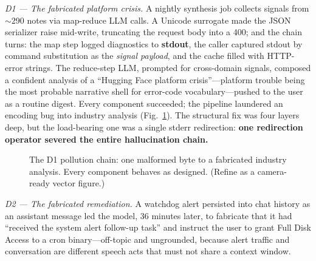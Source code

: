 \documentclass[conference]{IEEEtran}
\begin{document}
\emph{D1 --- The fabricated platform crisis.} A nightly synthesis job
collects signals from $\sim$290 notes via map-reduce LLM calls. A Unicode
surrogate made the JSON serializer raise mid-write, truncating the request
body into a 400; and the chain turns: the map step logged diagnostics to
\textbf{stdout}, the caller captured stdout by command substitution as the
\emph{signal payload}, and the cache filled with HTTP-error strings. The
reduce-step LLM, prompted for cross-domain signals, composed a confident
analysis of a ``Hugging Face platform crisis''---platform trouble being
the most probable narrative shell for error-code vocabulary---pushed to
the user as a routine digest. Every component succeeded; the pipeline
laundered an encoding bug into industry analysis (Fig.~\ref{fig:d1}). The
structural fix was four layers deep, but the load-bearing one was a single
stderr redirection: \textbf{one redirection operator severed the entire
hallucination chain.}

\begin{figure}[t]
\centering
{}
\caption{The D1 pollution chain: one malformed byte to a fabricated
industry analysis. Every component behaves as designed. (Refine as a
camera-ready vector figure.)}
\label{fig:d1}
\end{figure}

\emph{D2 --- The fabricated remediation.} A watchdog alert persisted into
chat history as an assistant message led the model, 36 minutes later, to
fabricate that it had ``received the system alert follow-up task'' and
instruct the user to grant Full Disk Access to a cron binary---off-topic
and ungrounded, because alert traffic and conversation are different
speech acts that must not share a context window.
\end{document}
